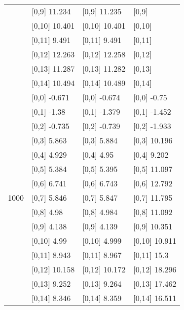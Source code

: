 \begin{table}
\begin{tabular}[t]{llll}
 & {}[0,9] 11.234 & {}[0,9] 11.235 & {}[0,9]\\
\addlinespace
 & {}[0,10] 10.401 & {}[0,10] 10.401 & {}[0,10]\\
 & {}[0,11] 9.491 & {}[0,11] 9.491 & {}[0,11]\\
 & {}[0,12] 12.263 & {}[0,12] 12.258 & {}[0,12]\\
 & {}[0,13] 11.287 & {}[0,13] 11.282 & {}[0,13]\\
 & {}[0,14] 10.494 & {}[0,14] 10.489 & {}[0,14]\\
\addlinespace
 & {}[0,0] -0.671 & {}[0,0] -0.674 & {}[0,0] -0.75\\
 & {}[0,1] -1.38 & {}[0,1] -1.379 & {}[0,1] -1.452\\
 & {}[0,2] -0.735 & {}[0,2] -0.739 & {}[0,2] -1.933\\
 & {}[0,3] 5.863 & {}[0,3] 5.884 & {}[0,3] 10.196\\
 & {}[0,4] 4.929 & {}[0,4] 4.95 & {}[0,4] 9.202\\
\addlinespace
 & {}[0,5] 5.384 & {}[0,5] 5.395 & {}[0,5] 11.097\\
 & {}[0,6] 6.741 & {}[0,6] 6.743 & {}[0,6] 12.792\\
1000 & {}[0,7] 5.846 & {}[0,7] 5.847 & {}[0,7] 11.795\\
 & {}[0,8] 4.98 & {}[0,8] 4.984 & {}[0,8] 11.092\\
 & {}[0,9] 4.138 & {}[0,9] 4.139 & {}[0,9] 10.351\\
\addlinespace
 & {}[0,10] 4.99 & {}[0,10] 4.999 & {}[0,10] 10.911\\
 & {}[0,11] 8.943 & {}[0,11] 8.967 & {}[0,11] 15.3\\
 & {}[0,12] 10.158 & {}[0,12] 10.172 & {}[0,12] 18.296\\
 & {}[0,13] 9.252 & {}[0,13] 9.264 & {}[0,13] 17.462\\
 & {}[0,14] 8.346 & {}[0,14] 8.359 & {}[0,14] 16.511\\
\bottomrule
\end{tabular}
\end{table}
